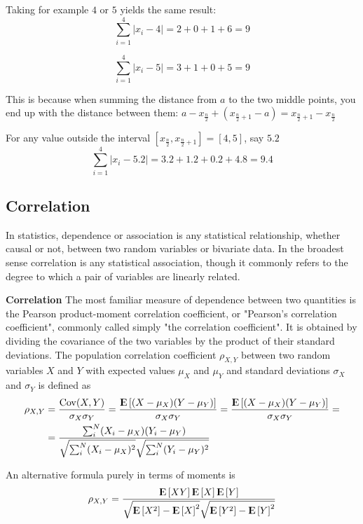 Taking for example $4$ or $5$ yields the same result:
$$
\sum_{i=1}^4|x_i-4|=2+0+1+6=9
$$

$$
\sum_{i=1}^4|x_i-5|=3+1+0+5=9
$$

This is because when summing the distance from $a$ to the two middle points, you end up with the distance between them: $a-x_{\tfrac{n}{2}}+(x_{\tfrac{n}{2}+1}-a) = x_{\tfrac{n}{2}+1}-x_{\tfrac{n}{2}}$

For any value outside the interval $\left[x_{\tfrac{n}{2}},x_{\tfrac{n}{2}+1}\right]=[4,5]$, say $5.2$
$$
\sum_{i=1}^4|x_i-5.2|=3.2+1.2+0.2+4.8=9.4
$$

\subsection{Correlation}
In statistics, dependence or association is any statistical relationship, whether causal or not, between two random variables or bivariate data. In the broadest sense correlation is any statistical association, though it commonly refers to the degree to which a pair of variables are linearly related.
\begin{definition}{\textbf{Correlation}}
The most familiar measure of dependence between two quantities is the Pearson product-moment correlation coefficient, or "Pearson's correlation coefficient", commonly called simply "the correlation coefficient". It is obtained by dividing the covariance of the two variables by the product of their standard deviations. The population correlation coefficient $\rho_{X,Y}$ between two random variables $X$ and $Y$ with expected values $\mu_X$ and $\mu_Y$ and standard deviations $\sigma _{X}$ and $\sigma_Y$ is defined as
\begin{equation}
\begin{aligned}
\rho_{X,Y}&= \frac{\Cov(X,Y)}{\sigma_X \sigma_Y} = \frac{\E\left[ \br{X -\mu_X} \br{Y -\mu_Y}\right]}{\sigma_X \sigma_Y} = \frac{\E\left[ \br{X -\mu_X} \br{Y -\mu_Y}\right]}{\sigma_X \sigma_Y} =\\
&= \frac{\sum_i^N \br{X_i -\mu_X} \br{Y_i -\mu_Y}}{\sqrt{\sum_i^N(X_i-\mu_X)^2}\sqrt{\sum_i^N(Y_i-\mu_Y)^2}}
\end{aligned}
\end{equation}

An alternative formula purely in terms of moments is
\begin{equation}
\rho_{X,Y} = \frac{  \E\left[ XY \right]     \E\left[ X \right]   \E\left[ Y \right]   }   {\sqrt{\E\left[ X^2\right]-\E\left[ X\right]^2}                      \sqrt{  \E\left[ Y^2\right] -    \E\left[ Y \right]^2} } 
\end{equation}
\end{definition}
